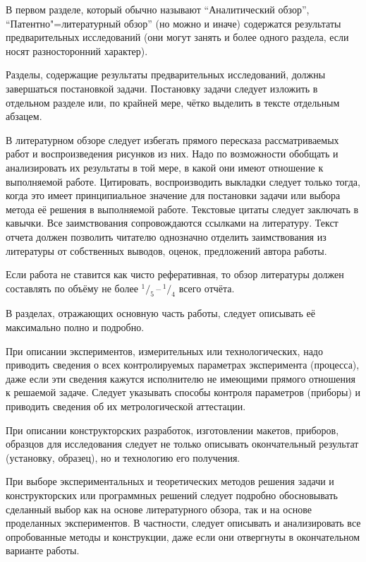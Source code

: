 \documentclass[utf8,14pt, coursreport]{G7-32}
\begin{document}
В первом разделе, который обычно называют ``Аналитический обзор'', ``Патентно"=литературный обзор'' (но можно и иначе) содержатся результаты предварительных исследований (они могут занять и более одного раздела, если носят разносторонний характер).

Разделы, содержащие результаты предварительных исследований, должны завершаться постановкой задачи. Постановку задачи следует изложить в отдельном разделе или, по крайней мере, чётко выделить в тексте отдельным абзацем.

В литературном обзоре следует избегать прямого пересказа рассматриваемых работ и воспроизведения рисунков из них. Надо по возможности обобщать и анализировать их результаты в той мере, в какой они имеют отношение к выполняемой работе. Цитировать, воспроизводить выкладки следует только тогда, когда это имеет принципиальное значение для постановки задачи или выбора метода её решения в выполняемой работе. Текстовые цитаты следует заключать в кавычки. Все заимствования сопровождаются ссылками на литературу. Текст отчета должен позволить читателю однозначно отделить заимствования из литературы от собственных выводов, оценок, предложений автора работы.

Если работа не ставится как чисто реферативная, то обзор литературы должен составлять по объёму не более $^1/_5$\,--\,$^1/_4$ всего отчёта.

В разделах, отражающих основную часть работы, следует описывать её максимально полно и подробно.

При описании экспериментов, измерительных или технологических, надо приводить сведения о всех контролируемых параметрах эксперимента (процесса), даже если эти сведения кажутся исполнителю не имеющими прямого отношения к решаемой задаче. Следует указывать способы контроля параметров (приборы) и приводить сведения об их метрологической аттестации.

При описании конструкторских разработок, изготовлении макетов, приборов, образцов для исследования следует не только описывать окончательный результат (установку, образец), но и технологию его получения.

При выборе экспериментальных и теоретических методов решения задачи и конструкторских или программных решений следует подробно обосновывать сделанный выбор как на основе литературного обзора, так и на основе проделанных экспериментов. В частности, следует описывать и анализировать все опробованные методы и конструкции, даже если они отвергнуты в окончательном варианте работы.
\end{document}
